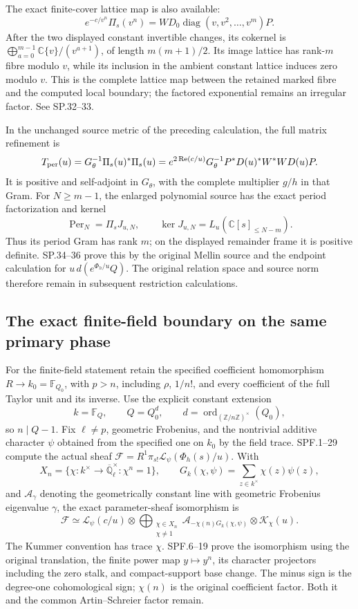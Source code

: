 \documentclass[11pt]{article}
\begin{document}
The exact finite-cover lattice map is also available:
\[
 e^{-c/v^n}\Pi_s(v^n)
    =WD_0\operatorname{diag}(v,v^2,\ldots,v^m)P .
\]
After the two displayed constant invertible changes, its cokernel is
\(\bigoplus_{a=0}^{m-1}\mathbb C\{v\}/(v^{a+1})\), of length
\(m(m+1)/2\).  Its image lattice has rank-\(m\) fibre modulo \(v\),
while its inclusion in the ambient constant lattice induces zero
modulo \(v\).  This is the complete lattice map between the retained
marked fibre and the computed local boundary; the factored
exponential remains an irregular factor.  See SP.32--33.

In the unchanged source metric of the preceding calculation, the
full matrix refinement is
\[
 T_{\rm per}(u)
 =G_\theta^{-1}\Pi_s(u)^*\Pi_s(u)
 =e^{2\operatorname{Re}(c/u)}
   G_\theta^{-1}P^*D(u)^*W^*WD(u)P .
\]
It is positive and self-adjoint in \(G_\theta\), with the complete
multiplier \(g/h\) in that Gram.  For \(N\geq m-1\), the enlarged
polynomial source has the exact period factorization and kernel
\[
 \operatorname{Per}_N=\Pi_sJ_{u,N},\qquad
 \ker J_{u,N}=L_u(\mathbb C[s]_{\leq N-m}).
\]
Thus its period Gram has rank \(m\); on the displayed remainder
frame it is positive definite.  SP.34--36 prove this by the original
Mellin source and the endpoint calculation for
\(u\,d(e^{\Phi_h/u}Q)\).  The original relation space and source norm
therefore remain in subsequent restriction calculations.

\subsection{The exact finite-field boundary on the same primary phase}

For the finite-field statement retain the specified coefficient
homomorphism \(R\to k_0=\mathbb F_{Q_0}\), with \(p>n\),
including \(\rho\), \(1/n!\), and every coefficient of the full
Taylor unit and its inverse.  Use the explicit constant extension
\[
 k=\mathbb F_Q,\qquad Q=Q_0^d,\qquad
 d=\operatorname{ord}_{(\mathbb Z/n\mathbb Z)^\times}(Q_0),
\]
so \(n\mid Q-1\).  Fix \(\ell\ne p\), geometric Frobenius, and the
nontrivial additive character \(\psi\) obtained from the specified
one on \(k_0\) by the field trace.  SPF.1--29 compute the actual sheaf
\(\mathcal F=R^1\pi_{s!}\mathcal L_\psi(\Phi_h(s)/u)\).
With
\[
 X_n=\{\chi:k^\times\to\overline{\mathbb Q}_\ell^\times:
             \chi^n=1\},\qquad
 G_k(\chi,\psi)=\sum_{z\in k^\times}\chi(z)\psi(z),
\]
and \(\mathcal A_\gamma\) denoting the geometrically constant line
with geometric Frobenius eigenvalue \(\gamma\), the exact
parameter-sheaf isomorphism is
\[
 \mathcal F\simeq
 \mathcal L_\psi(c/u)\otimes
 \bigoplus_{\substack{\chi\in X_n\\\chi\ne1}}
   \mathcal A_{-\chi(n)G_k(\chi,\psi)}
                  \otimes\mathcal K_\chi(u).
\]
The Kummer convention has trace \(\chi\).  SPF.6--19 prove the
isomorphism using the original translation, the finite power map
\(y\mapsto y^n\), its character projectors including the zero stalk,
and compact-support base change.  The minus sign is the degree-one
cohomological sign; \(\chi(n)\) is the original coefficient factor.
Both it and the common Artin--Schreier factor remain.
\end{document}
